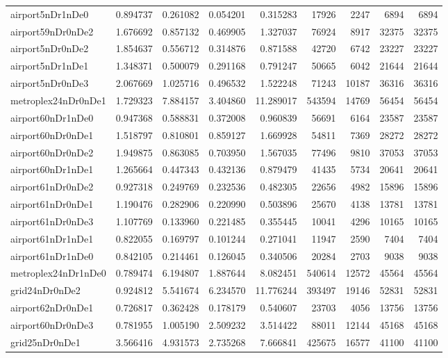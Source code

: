 \begin{longtable}{|l|r|r|r|r|r|r|r|r|}
airport5nDr1nDe0 & 0.894737 & 0.261082 & 0.054201 & 0.315283 & 17926 & 2247 & 6894 & 6894 \\
airport59nDr0nDe2 & 1.676692 & 0.857132 & 0.469905 & 1.327037 & 76924 & 8917 & 32375 & 32375 \\
airport5nDr0nDe2 & 1.854637 & 0.556712 & 0.314876 & 0.871588 & 42720 & 6742 & 23227 & 23227 \\
airport5nDr1nDe1 & 1.348371 & 0.500079 & 0.291168 & 0.791247 & 50665 & 6042 & 21644 & 21644 \\
airport5nDr0nDe3 & 2.067669 & 1.025716 & 0.496532 & 1.522248 & 71243 & 10187 & 36316 & 36316 \\
metroplex24nDr0nDe1 & 1.729323 & 7.884157 & 3.404860 & 11.289017 & 543594 & 14769 & 56454 & 56454 \\
airport60nDr1nDe0 & 0.947368 & 0.588831 & 0.372008 & 0.960839 & 56691 & 6164 & 23587 & 23587 \\
airport60nDr0nDe1 & 1.518797 & 0.810801 & 0.859127 & 1.669928 & 54811 & 7369 & 28272 & 28272 \\
airport60nDr0nDe2 & 1.949875 & 0.863085 & 0.703950 & 1.567035 & 77496 & 9810 & 37053 & 37053 \\
airport60nDr1nDe1 & 1.265664 & 0.447343 & 0.432136 & 0.879479 & 41435 & 5734 & 20641 & 20641 \\
airport61nDr0nDe2 & 0.927318 & 0.249769 & 0.232536 & 0.482305 & 22656 & 4982 & 15896 & 15896 \\
airport61nDr0nDe1 & 1.190476 & 0.282906 & 0.220990 & 0.503896 & 25670 & 4138 & 13781 & 13781 \\
airport61nDr0nDe3 & 1.107769 & 0.133960 & 0.221485 & 0.355445 & 10041 & 4296 & 10165 & 10165 \\
airport61nDr1nDe1 & 0.822055 & 0.169797 & 0.101244 & 0.271041 & 11947 & 2590 & 7404 & 7404 \\
airport61nDr1nDe0 & 0.842105 & 0.214461 & 0.126045 & 0.340506 & 20284 & 2703 & 9038 & 9038 \\
metroplex24nDr1nDe0 & 0.789474 & 6.194807 & 1.887644 & 8.082451 & 540614 & 12572 & 45564 & 45564 \\
grid24nDr0nDe2 & 0.924812 & 5.541674 & 6.234570 & 11.776244 & 393497 & 19146 & 52831 & 52831 \\
airport62nDr0nDe1 & 0.726817 & 0.362428 & 0.178179 & 0.540607 & 23703 & 4056 & 13756 & 13756 \\
airport60nDr0nDe3 & 0.781955 & 1.005190 & 2.509232 & 3.514422 & 88011 & 12144 & 45168 & 45168 \\
grid25nDr0nDe1 & 3.566416 & 4.931573 & 2.735268 & 7.666841 & 425675 & 16577 & 41100 & 41100 \\

\end{longtable}
